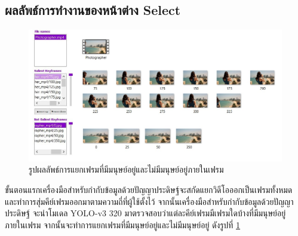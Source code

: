 \subsection*{ผลลัพธ์การทำงานของหน้าต่าง Select}
\begin{figure}[!ht]
  \centering
    \includegraphics[scale=0.6]{chapter4/images/Result/result_select3.jpg}
    \caption{รูปผลลัพธ์การแยกเฟรมที่มีมนุษย์อยู่และไม่มีมนุษย์อยู่ภายในเฟรม}
    \label{fig:result_select}
\end{figure}
ขั้นตอนแรกเครื่องมือสำหรับกำกับข้อมูลด้วยปัญญาประดิษฐ์จะสกัดแยกวิดีโอออกเป็นเฟรมทั้งหมด และทำการสุ่มคีย์เฟรมออกมาตามความถี่ที่ผู้ใช้ตั้งไว้ จากนั้นเครื่องมือสำหรับกำกับข้อมูลด้วยปัญญาประดิษฐ์ จะนำโมเดล YOLO-v3 320 มาตรวจสอบว่าแต่ละคีย์เฟรมมีเฟรมใดบ้างที่มีมนุษย์อยู่ภายในเฟรม จากนั้นจะทำการแยกเฟรมที่มีมนุษย์อยู่และไม่มีมนุษย์อยู่ ดังรูปที่ \ref{fig:result_select}


